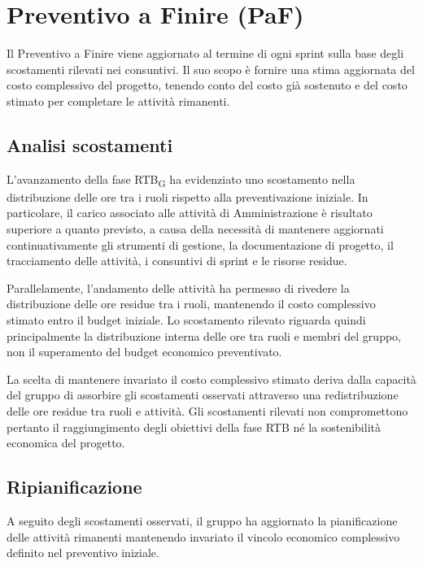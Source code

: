 \section{Preventivo a Finire (PaF)}
\label{sec:paf}

Il Preventivo a Finire viene aggiornato al termine di ogni sprint sulla base
degli scostamenti rilevati nei consuntivi. Il suo scopo è fornire una stima
aggiornata del costo complessivo del progetto, tenendo conto del costo già
sostenuto e del costo stimato per completare le attività rimanenti.

\subsection{Analisi scostamenti}

L'avanzamento della fase RTB\textsubscript{G} ha evidenziato uno scostamento
nella distribuzione delle ore tra i ruoli rispetto alla preventivazione iniziale.
In particolare, il carico associato alle attività di Amministrazione è risultato
superiore a quanto previsto, a causa della necessità di mantenere aggiornati continuativamente
 gli strumenti di gestione, la documentazione di progetto, il
tracciamento delle attività, i consuntivi di sprint e le risorse residue.

Parallelamente, l'andamento delle attività ha permesso di rivedere la
distribuzione delle ore residue tra i ruoli, mantenendo il costo complessivo
stimato entro il budget iniziale. Lo scostamento rilevato riguarda quindi
principalmente la distribuzione interna delle ore tra ruoli e membri del gruppo,
non il superamento del budget economico preventivato.

La scelta di mantenere invariato il costo complessivo stimato deriva dalla capacità del gruppo 
di assorbire gli scostamenti osservati attraverso una redistribuzione delle ore residue tra ruoli 
e attività. Gli scostamenti rilevati non compromettono pertanto il raggiungimento degli obiettivi 
della fase RTB né la sostenibilità economica del progetto.

\subsection{Ripianificazione}

A seguito degli scostamenti osservati, il gruppo ha aggiornato la pianificazione
delle attività rimanenti mantenendo invariato il vincolo economico complessivo
definito nel preventivo iniziale.


